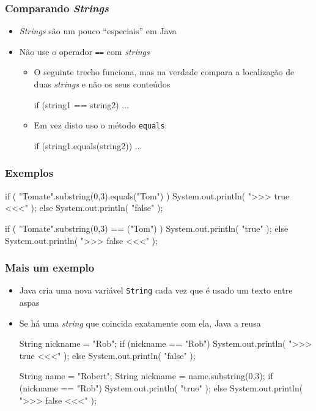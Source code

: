 \documentclass[xcolor={dvipsnames,table},aspectratio=169]{beamer}
\begin{document}
\begin{frame}[fragile]\frametitle{Comparando \emph{Strings}}
\begin{itemize}
	\item \emph{Strings} são um pouco ``especiais'' em Java
	\item Não use o operador \texttt{==} com \emph{strings}
	\begin{itemize}
		\item O seguinte trecho funciona, mas na verdade compara a localização de duas \emph{strings} e não os seus conteúdos
\begin{javacode}
if (string1 == string2) ...
\end{javacode}
		\item Em vez disto uso o método \texttt{equals}:
\begin{javacode}
if (string1.equals(string2)) ...
\end{javacode}
	\end{itemize}
\end{itemize}
\end{frame}

\begin{frame}[fragile]\frametitle{Exemplos}

\begin{javacode}
if ( "Tomate".substring(0,3).equals("Tom") )
   System.out.println( ">>> true <<<" );
else
   System.out.println( "false" );

if ( "Tomate".substring(0,3) == ("Tom") )
   System.out.println( "true" );
else
   System.out.println( ">>> false <<<" );
\end{javacode}
\end{frame}

\begin{frame}[fragile]\frametitle{Mais um exemplo}
\begin{itemize}
	\item Java cria uma nova variável \texttt{String} cada vez que é usado um texto entre aspas
	\item Se há uma \emph{string} que coincida exatamente com ela, Java a reusa
\footnotesize{
\begin{javacode}
String nickname = "Rob";
if (nickname == "Rob")
   System.out.println( ">>> true <<<" );
else
   System.out.println( "false" );
\end{javacode}
\begin{javacode}
String name = "Robert";
String nickname = name.substring(0,3);
if (nickname == "Rob")
   System.out.println( "true" );
else
   System.out.println( ">>> false <<<" );
\end{javacode}
}
\end{itemize}
\end{frame}
\end{document}
